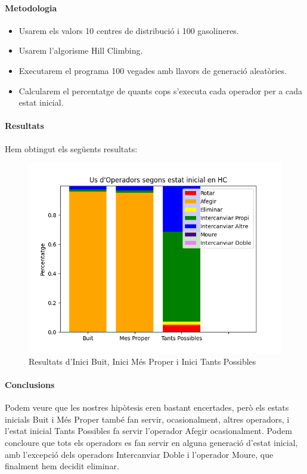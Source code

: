 \documentclass[a4paper]{article}
\begin{document}
\paragraph{Metodologia}
\begin{itemize}
\item Usarem els valors 10 centres de distribució i 100 gasolineres.
\item Usarem l'algorisme Hill Climbing.
\item Executarem el programa 100 vegades amb llavors de generació aleatòries.
\item Calcularem el percentatge de quants cops s'executa cada operador per a cada estat inicial.
\end{itemize}

\paragraph{Resultats} Hem obtingut els següents resultats:

\begin{figure}[htp]
\centering
\includegraphics[scale=0.75]{images/barplots.png}
\caption{Resultats d'Inici Buit, Inici Més Proper i Inici Tants Possibles}
\centering
\end{figure}

\paragraph{Conclusions} Podem veure que les nostres hipòtesis eren bastant encertades, però els estats inicials Buit i Més Proper també fan servir, ocasionalment, altres operadors, i l'estat inicial Tants Possibles fa servir l'operador Afegir ocasionalment. Podem concloure que tots els operadors es fan servir en alguna generació d'estat inicial, amb l'excepció dels operadors Intercanviar Doble i l'operador Moure, que finalment hem decidit eliminar.
\end{document}
